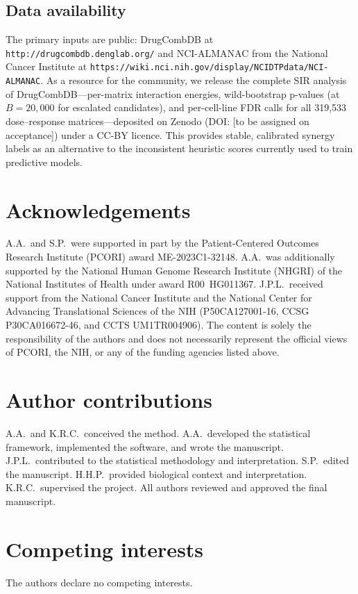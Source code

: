 \documentclass[pdflatex,sn-nature]{sn-jnl}%
\begin{document}
\subsection{Data availability}
The primary inputs are public: DrugCombDB \cite{DrugCombDB2020} at \texttt{http://drugcombdb.denglab.org/} and NCI-ALMANAC from the National Cancer Institute at \texttt{https://wiki.nci.nih.gov/display/NCIDTPdata/NCI-ALMANAC}.
As a resource for the community, we release the complete SIR analysis of DrugCombDB---per-matrix interaction energies, wild-bootstrap p-values (at $B=20{,}000$ for escalated candidates), and per-cell-line FDR calls for all 319{,}533 dose--response matrices---deposited on Zenodo (DOI: [to be assigned on acceptance]) under a CC-BY licence.
This provides stable, calibrated synergy labels as an alternative to the inconsistent heuristic scores currently used to train predictive models.

\section*{Acknowledgements}
A.A.\ and S.P.\ were supported in part by the Patient-Centered Outcomes Research Institute (PCORI) award ME-2023C1-32148.
A.A.\ was additionally supported by the National Human Genome Research Institute (NHGRI) of the National Institutes of Health under award R00~HG011367.
J.P.L.\ received support from the National Cancer Institute and the National Center for Advancing Translational Sciences of the NIH (P50CA127001-16, CCSG P30CA016672-46, and CCTS UM1TR004906).
The content is solely the responsibility of the authors and does not necessarily represent the official views of PCORI, the NIH, or any of the funding agencies listed above.

\section*{Author contributions}
A.A.\ and K.R.C.\ conceived the method.
A.A.\ developed the statistical framework, implemented the software, and wrote the manuscript.
J.P.L.\ contributed to the statistical methodology and interpretation.
S.P.\ edited the manuscript.
H.H.P.\ provided biological context and interpretation.
K.R.C.\ supervised the project.
All authors reviewed and approved the final manuscript.

\section*{Competing interests}
The authors declare no competing interests.


\end{document}
